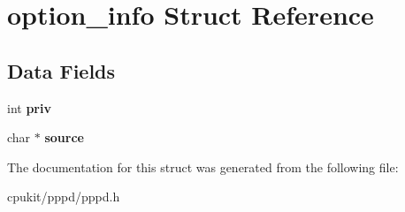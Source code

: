 \hypertarget{structoption__info}{}\section{option\+\_\+info Struct Reference}
\label{structoption__info}
\subsection*{Data Fields}
\begin{DoxyCompactItemize}
\item 
\mbox{\label{structoption__info_a7a7b0e5c795a2ed7b1d1c6c6c58e9fb9}} 
int {\bfseries priv}
\item 
\mbox{\label{structoption__info_a06f36d779638485630c16b4e27569229}} 
char $\ast$ {\bfseries source}
\end{DoxyCompactItemize}


The documentation for this struct was generated from the following file\+:\begin{DoxyCompactItemize}
\item 
cpukit/pppd/pppd.\+h\end{DoxyCompactItemize}
